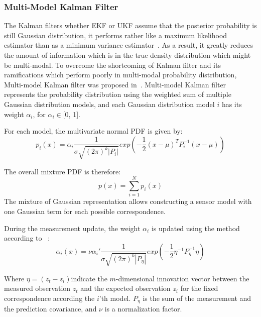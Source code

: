 \subsubsection{Multi-Model Kalman Filter}\label{sub:mmkalman}
The Kalman filters whether \gls{EKF} or \gls{UKF} assume that the posterior probability is still Gaussian distribution, it performs rather like a maximum likelihood estimator than as a minimum variance estimator~\cite{alspach1972nonlinear}. As a result, it greatly reduces the amount of information which is in the true density distribution which might be multi-modal. To overcome the shortcoming of Kalman filter and its ramifications which perform poorly in multi-modal probability distribution, Multi-model Kalman filter was proposed in~\cite{alspach1972nonlinear}. Multi-model Kalman filter represents the probability distribution using the weighted sum of multiple Gaussian distribution models, and each Gaussian distribution model $i$ has its weight $\alpha_i$, for $\alpha_i \in $[0, 1].

For each model, the multivariate normal \gls{PDF} is given by:
\begin{equation}
\label{eq:mmkalman}
p_{i}(x) = \alpha_i\frac{1}{\sigma \sqrt {(2\pi)^k|P_i|}}exp(-\frac{1}{2}(x-\mu)^TP_i^{-1}(x-\mu))
\end{equation}

The overall mixture \gls{PDF} is therefore:
\begin{equation}
\label{eq:mmkalmansum}
p(x) = \sum_{i=1}^{N}p_i(x)
\end{equation}
The mixture of Gaussian representation allows constructing a sensor model with one Gaussian term for each possible correspondence.

During the measurement update, the weight $\alpha_i$ is updated using the method according to ~\cite{alspach1972nonlinear}:
\begin{equation}
\label{eq:weightupdate}
\alpha_{i}(x) = \nu\alpha_i'\frac{1}{\sigma \sqrt {(2\pi)^k|P_\eta|}}exp(-\frac{1}{2}\eta^{-1}P_\eta^{-1}\eta)
\end{equation}

Where $\eta = (z_t - z\widehat{}_i)$indicate the $m$-dimensional innovation vector between the measured observation $z_t$ and the expected observation $z\widehat{}_i$ for the fixed correspondence according the $i$'th model. $P_\eta$ is the sum of the measurement and the prediction covariance, and $\nu$ is a normalization factor.

